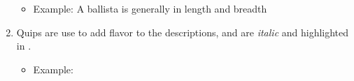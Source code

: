 \begin{enumerate}[leftmargin=12pt]
	\begin{itemize}\item Example: A ballista is generally  in length and breadth\end{itemize}
\item Quips are use to add flavor to the descriptions, and are \textit{italic} and highlighted in .
	\begin{itemize}\item Example: \end{itemize}
\end{enumerate}